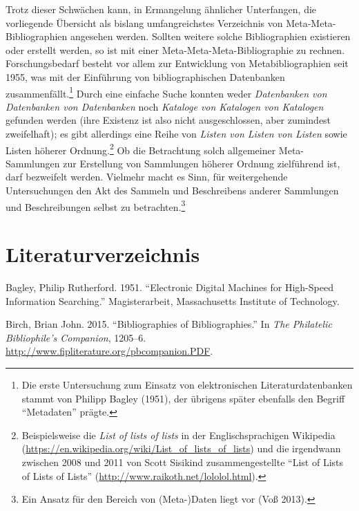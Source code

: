 \documentclass[a4paper,
fontsize=11pt,
oneside,
numbers=noperiodatend,
parskip=half-,
bibliography=totoc,
final
]{scrartcl}
\begin{document}
Trotz dieser Schwächen kann, in Ermangelung ähnlicher Unterfangen, die
vorliegende Übersicht als bislang umfangreichstes Verzeichnis von
Meta-Meta- Bibliographien angesehen werden. Sollten weitere solche
Bibliographien existieren oder erstellt werden, so ist mit einer
Meta-Meta-Meta-Bibliographie zu rechnen. Forschungsbedarf besteht vor
allem zur Entwicklung von Metabibliographien seit 1955, was mit der
Einführung von bibliographischen Datenbanken zusammenfällt.\footnote{Die
  erste Untersuchung zum Einsatz von elektronischen Literaturdatenbanken
  stammt von Philipp Bagley (1951), der übrigens später ebenfalls den
  Begriff \enquote{Metadaten} prägte.} Durch eine einfache Suche konnten
weder \emph{Datenbanken von Datenbanken von Datenbanken} noch
\emph{Kataloge von Katalogen von Katalogen} gefunden werden (ihre
Existenz ist also nicht ausgeschlossen, aber zumindest zweifelhaft); es
gibt allerdings eine Reihe von \emph{Listen von Listen von Listen} sowie
Listen höherer Ordnung.\footnote{Beispielsweise die \emph{List of lists
  of lists} in der Englischsprachigen Wikipedia
  (\url{https://en.wikipedia.org/wiki/List_of_lists_of_lists}) und die
  irgendwann zwischen 2008 und 2011 von Scott Sisikind zusammengestellte
  \enquote{List of Lists of Lists of Lists}
  (\url{http://www.raikoth.net/lololol.html}).} Ob die Betrachtung solch
allgemeiner Meta-Sammlungen zur Erstellung von Sammlungen höherer
Ordnung zielführend ist, darf bezweifelt werden. Vielmehr macht es Sinn,
für weitergehende Untersuchungen den Akt des Sammeln und Beschreibens
anderer Sammlungen und Beschreibungen selbst zu betrachten.\footnote{Ein
  Ansatz für den Bereich von (Meta-)Daten liegt vor (Voß 2013).}

\section*{Literaturverzeichnis}\label{literaturverzeichnis}

Bagley, Philip Rutherford. 1951. ``Electronic Digital Machines for
High-Speed Information Searching.'' Magisterarbeit, Massachusetts
Institute of Technology.

Birch, Brian John. 2015. ``Bibliographies of Bibliographies.'' In
\emph{The Philatelic Bibliophile's Companion}, 1205--6.
\url{http://www.fipliterature.org/pbcompanion.PDF}.
\end{document}
